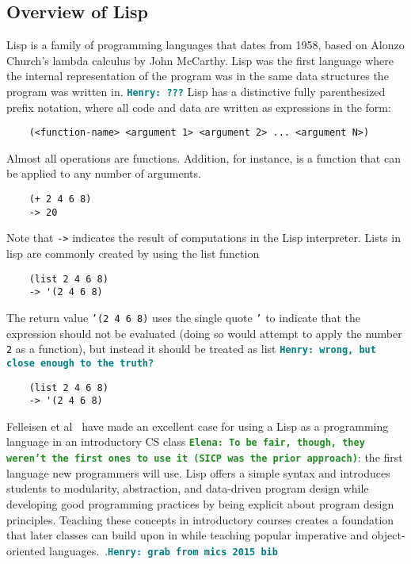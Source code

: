 \documentclass[12pt]{article}
\newcommand{\comment}[1]{{\bf \tt  {#1}}}
\newcommand{\emcomment}[1]{\textcolor{ForestGreen}{\comment{Elena: {#1}}}}
\newcommand{\hfcomment}[1]{\textcolor{Teal}{\comment{Henry: {#1}}}}
\begin{document}
	\subsection{Overview of Lisp}\label{sec:lisp}

	Lisp is a family of programming languages that dates from 1958, based on Alonzo Church's lambda calculus 
	 by John McCarthy. Lisp was the first language where the internal representation of the program was in the same data structures the program was written in. \hfcomment{???} Lisp has a distinctive fully parenthesized prefix notation, where all code and data are written as expressions in the form:
	\begin{verbatim}
	(<function-name> <argument 1> <argument 2> ... <argument N>)
	\end{verbatim}
Almost all operations are functions. Addition, for instance, is a function that can be applied to any number of arguments.
	\begin{verbatim}
	(+ 2 4 6 8)
	-> 20
	\end{verbatim}
Note that \texttt{->} indicates the result of computations in the Lisp interpreter. Lists in lisp are commonly created by using the list function
 	\begin{verbatim}
	(list 2 4 6 8)
	-> '(2 4 6 8)
	\end{verbatim}
The return value \texttt{'(2 4 6 8)} uses the single quote \texttt{'} to indicate that the expression should not be evaluated (doing so would attempt to apply the number \texttt{2} as a function), but instead it should be treated as list \hfcomment{wrong, but close enough to the truth?}	
	\begin{verbatim}
	(list 2 4 6 8)
	-> '(2 4 6 8)
	\end{verbatim}
	
	Felleisen et al~\cite{Felleisen:2004} have made an excellent case for using a Lisp as a programming language in an introductory CS class
	\emcomment{To be fair, though, they weren't the first ones to use it (SICP was the prior approach)}:
the first language new programmers will use. Lisp offers a simple
syntax and introduces students to modularity, abstraction, and
data-driven program design while developing good programming
practices by being explicit about program design principles.
Teaching these concepts in introductory courses creates a foundation that later classes can build upon in  while teaching popular imperative and object-oriented languages.~\cite{Bieniusa:2008}.\hfcomment{grab from mics 2015 bib} 
\end{document}
